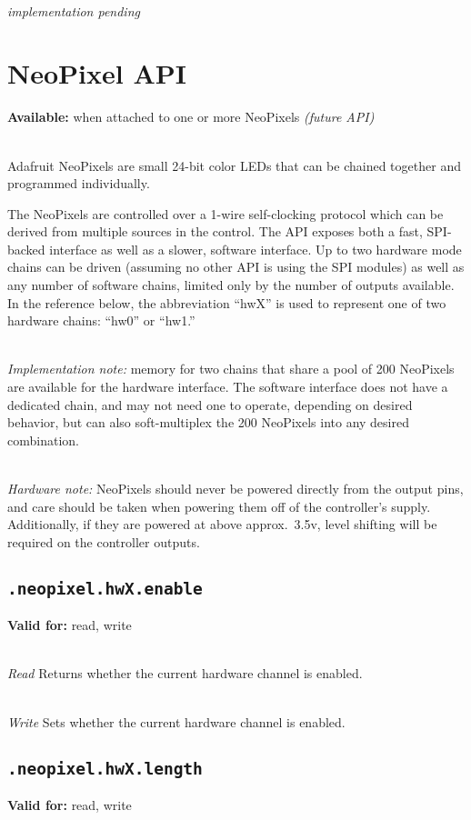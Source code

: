 \documentclass{article}
\begin{document}
~\\
\textit{implementation pending}

\section{NeoPixel API}
\textbf{Available:} when attached to one or more NeoPixels \textit{(future API)}

~\\
Adafruit NeoPixels are small 24-bit color LEDs that can be chained together and programmed individually.

The NeoPixels are controlled over a 1-wire self-clocking protocol which can be derived from multiple sources in the control. The API exposes both a fast, SPI-backed interface as well as a slower, software interface.
Up to two hardware mode chains can be driven (assuming no other API is using the SPI modules) as well as any number of software chains, limited only by the number of outputs available. In the reference below,
the abbreviation ``hwX'' is used to represent one of two hardware chains: ``hw0'' or ``hw1.''

~\\
\textit{Implementation note:} memory for two chains that share a pool of 200 NeoPixels are available for the hardware interface. The software interface does not have a dedicated chain, and
may not need one to operate, depending on desired behavior, but can also soft-multiplex the 200 NeoPixels into any desired combination.

~\\
\textit{Hardware note:} NeoPixels should never be powered directly from the output pins, and care should be taken when powering them off of the controller's supply.
Additionally, if they are powered at above approx.~3.5v, level shifting will be required on the controller outputs.

\subsection{\texttt{.neopixel.hwX.enable}}
\textbf{Valid for:} read, write

~\\
\textit{Read}
Returns whether the current hardware channel is enabled.

~\\
\textit{Write}
Sets whether the current hardware channel is enabled.

\subsection{\texttt{.neopixel.hwX.length}}
\textbf{Valid for:} read, write
\end{document}
